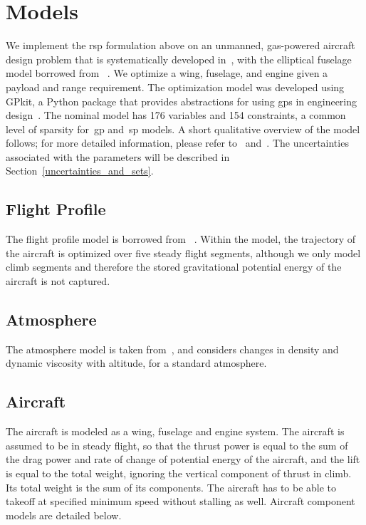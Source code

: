 \section{Models}

We implement the \gls{rsp} formulation above on an unmanned, gas-powered
aircraft design problem that is systematically developed in~\cite{Ozturk2018},
with the elliptical fuselage model borrowed from ~\cite{Burton2017}.
We optimize a wing, fuselage, and engine given a payload and range requirement.
The optimization model was developed using GPkit, a Python package that
provides abstractions for using \gls{gp}s in engineering design~\cite{gpkit}.
The nominal model has 176 variables and 154 constraints, a common level of
sparsity for~\gls{gp} and~\gls{sp} models.
A short qualitative overview of the model follows; for
more detailed information, please refer to~\cite{Burton2017} and~\cite{Ozturk2018}. The uncertainties
associated with the parameters will be described in Section~\ref{uncertainties_and_sets}.

\subsection{Flight Profile}

The flight profile model is borrowed from ~\cite{York2018}. Within the model, the
trajectory of the aircraft is optimized over five steady flight segments,
although we only model climb segments
and therefore the stored gravitational potential energy of the aircraft is not captured.

\subsection{Atmosphere}

The atmosphere model is taken from~\cite{Tao2018}, and considers changes in density and dynamic
viscosity with altitude, for a standard atmosphere.

\subsection{Aircraft}

The aircraft is modeled as a wing, fuselage and engine system. The aircraft is assumed
to be in steady flight, so that the thrust power is equal to the sum of the drag power and rate of change
of potential energy of the aircraft, and the lift is equal to the total weight, ignoring the vertical component of
thrust in climb. Its total weight is the sum of its components.
The aircraft has to be able to takeoff at specified minimum speed without stalling as well.
Aircraft component models are detailed below.

